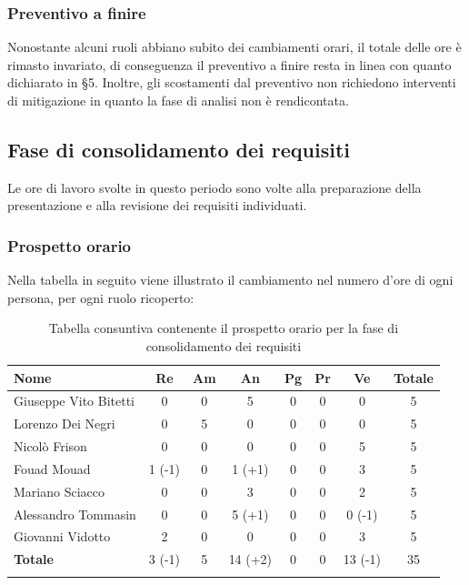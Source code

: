 		\subsubsection{Preventivo a finire}
			Nonostante alcuni ruoli abbiano subito dei cambiamenti orari, il totale delle ore è rimasto invariato, di conseguenza il preventivo a finire resta in linea con quanto dichiarato in \S5.
			\newline
			Inoltre, gli scostamenti dal preventivo non richiedono interventi di mitigazione in quanto la fase di analisi non è rendicontata.

		\subsection{Fase di consolidamento dei requisiti}
		Le ore di lavoro svolte in questo periodo sono volte alla preparazione della presentazione e alla revisione dei requisiti individuati. 
		\subsubsection{Prospetto orario}
			Nella tabella in seguito viene illustrato il cambiamento nel numero d'ore di ogni persona, per ogni ruolo ricoperto:
			
			\begin{longtable}{|l|c|c|c|c|c|c|c|}
				\hline
				\rowcolor{lighter-grayer}
				\textbf{Nome} & \textbf{Re} & \textbf{Am} & \textbf{An} & \textbf{Pg}  & \textbf{Pr}   & \textbf{Ve} & \textbf{Totale} \\
				\hline
				\endfirsthead
				
				\hline
				Giuseppe Vito Bitetti 	& 0 & 0 & 5 & 0 & 0 & 0 & 5\\
				\hline
				\hline
				Lorenzo Dei Negri	 	& 0 & 5 & 0 & 0 & 0 & 0 & 5\\
				\hline
				\hline
				Nicolò Frison			   & 0 & 0 & 0 & 0 & 0 & 5 & 5\\
				\hline
				\hline
				Fouad Mouad 			& 1 (-1) & 0 & 1 (+1) & 0 & 0 & 3 & 5\\
				\hline
				\hline
				Mariano Sciacco		 	& 0 & 0 & 3 & 0 & 0 & 2 & 5\\
				\hline
				\hline
				Alessandro Tommasin & 0 & 0 & 5 (+1) & 0 & 0 & 0 (-1) & 5\\
				\hline
				\hline
				Giovanni Vidotto 		 & 2 & 0 & 0 & 0 & 0 & 3 & 5\\
				\hline 
				\textbf{Totale} 			& 3 (-1) &  5 & 14 (+2) & 0 & 0 & 13 (-1) & 35\\
				\hline
				\caption{Tabella consuntiva contenente il prospetto orario per la fase di consolidamento dei requisiti}
			\end{longtable}
			
